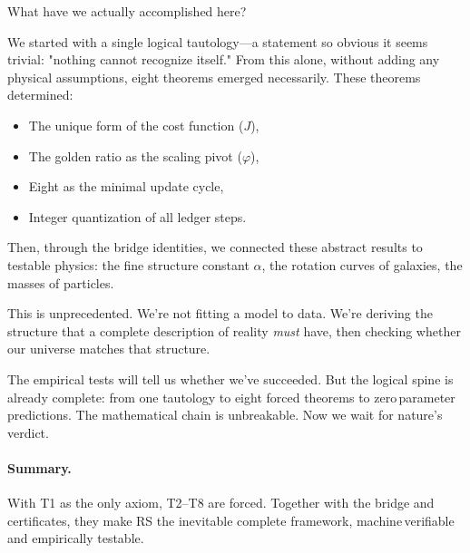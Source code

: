 \documentclass[11pt]{article}
\begin{document}
\begin{explanationbox}
What have we actually accomplished here?

We started with a single logical tautology—a statement so obvious it seems trivial: "nothing cannot recognize itself." From this alone, without adding any physical assumptions, eight theorems emerged necessarily. These theorems determined:
\begin{itemize}
  \item The unique form of the cost function ($J$),
  \item The golden ratio as the scaling pivot ($\varphi$),
  \item Eight as the minimal update cycle,
  \item Integer quantization of all ledger steps.
\end{itemize}

Then, through the bridge identities, we connected these abstract results to testable physics: the fine structure constant $\alpha$, the rotation curves of galaxies, the masses of particles.

This is unprecedented. We're not fitting a model to data. We're deriving the structure that a complete description of reality \textit{must} have, then checking whether our universe matches that structure.

The empirical tests will tell us whether we've succeeded. But the logical spine is already complete: from one tautology to eight forced theorems to zero\,parameter predictions. The mathematical chain is unbreakable. Now we wait for nature's verdict.
\end{explanationbox}

\paragraph{Summary.} With T1 as the only axiom, T2--T8 are forced. Together with the bridge and certificates, they make RS the inevitable complete framework, machine\,verifiable and empirically testable.
\end{document}
